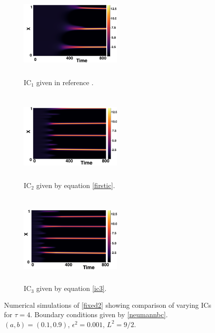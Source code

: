 \begin{figure}[H]
    \centering
    \begin{subfigure}[t]{0.32\textwidth}
        \centering
        \includegraphics[width=5cm,height=4.5cm]{gaff4.png}
        \caption{$\text{IC}_1$ given in reference \cite{gaffmonk}.}
        \label{}
    \end{subfigure}
    \hfill
    \begin{subfigure}[t]{0.32\textwidth}
        \centering
        \includegraphics[width=5cm,height=4.5cm]{ic24.png}
        \caption{$\text{IC}_2$ given by equation \eqref{firstic}.}
        \label{}
    \end{subfigure}
    \hfill
    \begin{subfigure}[t]{0.32\textwidth}
        \centering
        \includegraphics[width=5cm,height=4.5cm]{ic34.png}
        \caption{$\text{IC}_3$ given by equation \eqref{ic3}.}
        \label{}
    \end{subfigure}
    \caption{Numerical simulations of \eqref{fixed2} showing comparison of varying ICs for $\tau=4$. Boundary conditions given by \eqref{neumannbc}. $(a,b)=(0.1,0.9)$, $\epsilon^2=0.001$, $L^2=9/2$.}
    \label{fig:figtau4}
\end{figure}
